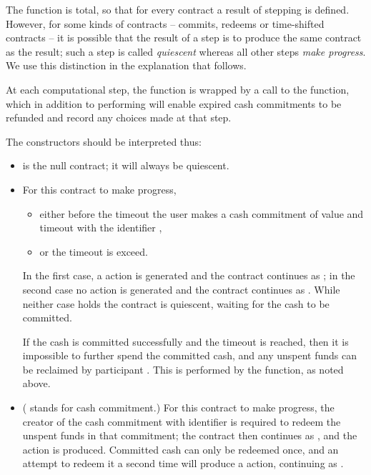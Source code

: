 \documentclass[
      acmsmall
    , screen
    , review=true
  ]{acmart}
\begin{document}
The  function is total, so that for every contract a result of stepping is defined. However, for some kinds of contracts -- commits, redeems or time-shifted contracts -- it is possible that the result of a step is to produce the same contract as the result; such a step is called \emph{quiescent} whereas all other steps \emph{make progress}. We use this distinction in the explanation that follows.


At each computational step, the  function is wrapped by a call to the  function, which in addition to performing  will enable expired cash commitments to be refunded and record any choices made at that step.


The constructors should be interpreted thus:

\begin{itemize} 

\item {} is the null contract; it will always be quiescent.

\item {}  For this contract to make progress,\begin{itemize}
\item either before the timeout  the user  makes a cash commitment of value  and timeout   with the identifier  , 
\item
or the timeout  is exceed.
\end{itemize} 
In the first case, a  action is generated and the contract continues as 
; in the second case no action is generated and the contract continues as 
. While neither case holds the contract is quiescent, waiting for the cash to be committed. 

If the cash is committed successfully and the timeout  is reached, then it is impossible to further spend the committed cash, and any unspent funds can be reclaimed by participant .
 This is performed by the  function, as noted above.

\item {} ( stands for cash commitment.) For this contract to make progress, the creator of the cash commitment with identifier  is required to redeem the unspent funds in that commitment; the contract then continues as , and the action  is produced. 
Committed cash can only be redeemed once, and an attempt to redeem it a second time will produce a   action, continuing as .


\end{itemize}
\end{document}
